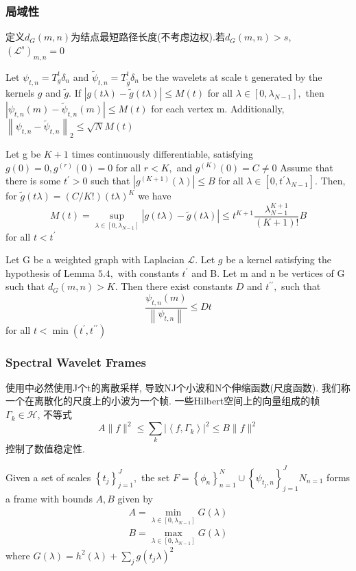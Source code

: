 \documentclass{article}
\begin{document}
\subsubsection{局域性}

     定义$d_G(m,n)$为结点最短路径长度(不考虑边权).若$d_G(m,n)>s$, $\left(\mathcal{L}^{s}\right)_{m, n}=0$

     Let $\psi_{t, n}=T_{g}^{t} \delta_{n}$ and $\tilde{\psi}_{t, n}=T_{\tilde{g}}^{t} \delta_{n}$ be the wavelets at scale t generated by the kernels $g$ and $\tilde{g} .$ If $|g(t \lambda)-\tilde{g}(t \lambda)| \leqslant M(t)$ for all $\lambda \in\left[0, \lambda_{N-1}\right],$ then $\left|\psi_{t, n}(m)-\tilde{\psi}_{t, n}(m)\right| \leqslant M(t)$ for each vertex m. Additionally, $\left\|\psi_{t, n}-\tilde{\psi}_{t, n}\right\|_{2} \leqslant \sqrt{N} M(t)$

     Let g be $K+1$ times continuously differentiable, satisfying $g(0)=0, g^{(r)}(0)=0$ for all $r<K,$ and $g^{(K)}(0)=C \neq 0$ Assume that there is some $t^{\prime}>0$ such that $\left|g^{(K+1)}(\lambda)\right| \leqslant B$ for all $\lambda \in\left[0, t^{\prime} \lambda_{N-1}\right]$. Then, for $\tilde{g}(t \lambda)=(C / K !)(t \lambda)^{K}$ we have
    $$
    M(t)=\sup _{\lambda \in\left[0, \lambda_{N-1}\right]}|g(t \lambda)-\tilde{g}(t \lambda)| \leqslant t^{K+1} \frac{\lambda_{N-1}^{K+1}}{(K+1) !} B
    $$
    for all $t<t^{\prime}$

     Let G be a weighted graph with Laplacian $\mathcal{L}$. Let $g$ be a kernel satisfying the hypothesis of Lemma $5.4,$ with constants $t^{\prime}$ and B. Let m and n be vertices of G such that $d_{G}(m, n)>K .$ Then there exist constants $D$ and $t^{\prime \prime},$ such that
    $$
    \frac{\psi_{t, n}(m)}{\left\|\psi_{t, n}\right\|} \leqslant D t
    $$
    for all $t<\min \left(t^{\prime}, t^{\prime \prime}\right)$

\subsubsection{Spectral Wavelet Frames}

    使用中必然使用J个t的离散采样, 导致NJ个小波和N个伸缩函数(尺度函数). 我们称一个在离散化的尺度上的小波为一个帧. 一些Hilbert空间上的向量组成的帧$\Gamma_{k} \in \mathcal{H}$, 不等式
    $$A\|f\|^{2} \leqslant \sum_{k}\left|\left\langle f, \Gamma_{k}\right\rangle\right|^{2} \leqslant B\|f\|^{2}$$
    控制了数值稳定性.

     Given a set of scales $\left\{t_{j}\right\}_{j=1}^{J},$ the set $F=\left\{\phi_{n}\right\}_{n=1}^{N} \cup\left\{\psi_{t_{j}, n}\right\}_{j=1}^{J} N_{n=1}$ forms a frame with bounds $A, B$ given by
    $$
    \begin{array}{l}
    A=\min _{\lambda \in\left[0, \lambda_{N-1}\right]} G(\lambda) \\
    B=\max _{\lambda \in\left[0, \lambda_{N-1}\right]} G(\lambda)
    \end{array}
    $$
    where $G(\lambda)=h^{2}(\lambda)+\sum_{j} g\left(t_{j} \lambda\right)^{2}$
\end{document}
